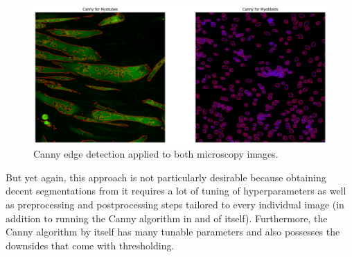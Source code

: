 \begin{figure}
	\centering
	\includegraphics[width=\textwidth]{"images/canny.png"}
	\caption{Canny edge detection applied to both microscopy images.}
	\label{figcanny}
\end{figure}

But yet again, this approach is not particularly desirable because obtaining decent segmentations from it requires a lot of tuning of hyperparameters as well as preprocessing and postprocessing steps tailored to every individual image (in addition to running the Canny algorithm in and of itself). Furthermore, the Canny algorithm by itself has many tunable parameters and also possesses the downsides that come with thresholding.
\newpage
